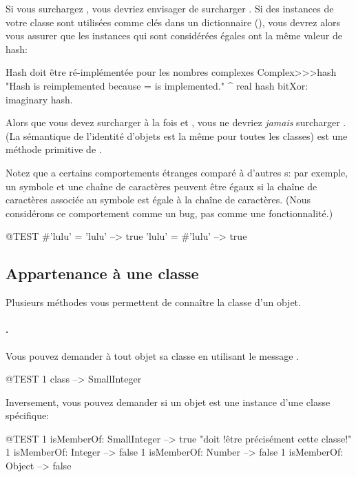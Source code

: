 \documentclass[a4paper,10pt,twoside]{book}
\begin{document}
Si vous surchargez \ct{=}, vous devriez envisager de surcharger . Si des instances de votre classe sont utilis\'ees comme cl\'es dans un dictionnaire (), vous devrez alors vous assurer que les instances qui sont consid\'er\'ees \'egales ont la m\^eme valeur de hash:
\begin{method}{Hash doit \^etre r\'e-impl\'ement\'ee pour les nombres complexes}
Complex>>>hash
    "Hash is reimplemented because = is implemented."
    ^ real hash bitXor: imaginary hash.
\end{method}

Alors que vous devez surcharger \`a la fois \ct{=} et , vous ne devriez \emph{jamais} surcharger \ct{==}. (La s\'emantique de l'identit\'e d'objets est la m\^eme pour toutes les classes)  \ct{==} est une m\'ethode primitive de .

Notez que \sq a certains comportements \'etranges compar\'e \`a d'autres \st{}s: par exemple, un symbole et une cha\^ine de caract\`eres peuvent \^etre \'egaux si la cha\^ine de caract\`eres associ\'ee au symbole est \'egale \`a la cha\^ine de caract\`eres. (Nous consid\'erons ce comportement comme un bug, pas comme une fonctionnalit\'e.)

\begin{code}{@TEST}
#'lulu' = 'lulu' --> true
'lulu' = #'lulu' --> true
\end{code}


\subsection{Appartenance \`a une classe}
Plusieurs m\'ethodes vous permettent de conna\^itre la classe d'un objet.

\paragraph{.} Vous pouvez demander \`a tout objet sa classe en utilisant le message .
\begin{code}{@TEST}
1 class --> SmallInteger
\end{code}

Inversement, vous pouvez demander si un objet est une instance d'une classe sp\'ecifique:
\begin{code}{@TEST}
1 isMemberOf: SmallInteger --> true    "doit !\^etre pr\'ecis\'ement cette classe!"
1 isMemberOf: Integer      --> false
1 isMemberOf: Number       --> false
1 isMemberOf: Object       --> false
\end{code}
\end{document}
